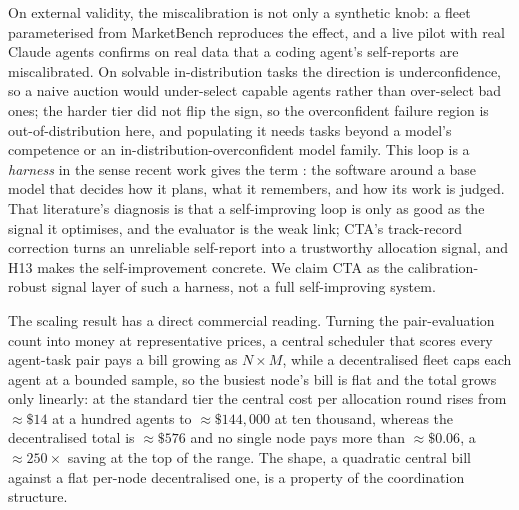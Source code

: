 \documentclass[11pt]{article}
\begin{document}
On external validity, the miscalibration is not only a synthetic knob: a fleet parameterised from MarketBench reproduces the effect, and a live pilot with real Claude agents confirms on real data that a coding agent's self-reports are miscalibrated. On solvable in-distribution tasks the direction is underconfidence, so a naive auction would under-select capable agents rather than over-select bad ones; the harder tier did not flip the sign, so the overconfident failure region is out-of-distribution here, and populating it needs tasks beyond a model's competence or an in-distribution-overconfident model family. This loop is a \emph{harness} in the sense recent work gives the term \citep{weng2026harness}: the software around a base model that decides how it plans, what it remembers, and how its work is judged. That literature's diagnosis is that a self-improving loop is only as good as the signal it optimises, and the evaluator is the weak link; CTA's track-record correction turns an unreliable self-report into a trustworthy allocation signal, and H13 makes the self-improvement concrete. We claim CTA as the calibration-robust signal layer of such a harness, not a full self-improving system.

The scaling result has a direct commercial reading. Turning the pair-evaluation count into money at representative prices, a central scheduler that scores every agent-task pair pays a bill growing as $N\times M$, while a decentralised fleet caps each agent at a bounded sample, so the busiest node's bill is flat and the total grows only linearly: at the standard tier the central cost per allocation round rises from $\approx\$14$ at a hundred agents to $\approx\$144{,}000$ at ten thousand, whereas the decentralised total is $\approx\$576$ and no single node pays more than $\approx\$0.06$, a $\approx 250\times$ saving at the top of the range. The shape, a quadratic central bill against a flat per-node decentralised one, is a property of the coordination structure.
\end{document}
